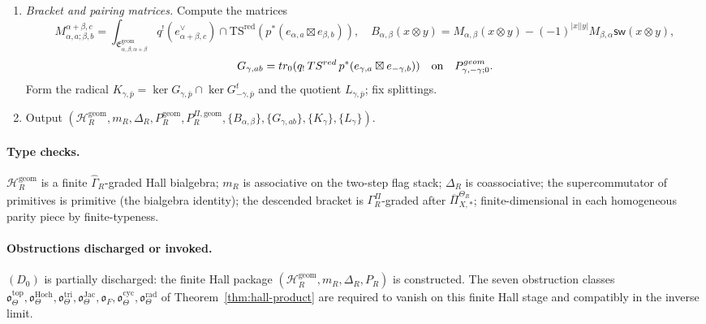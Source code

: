 \begin{enumerate}
\item \emph{Bracket and pairing matrices.}  Compute the matrices
\[
M^{\alpha+\beta,c}_{\alpha,a;\beta,b}
=\int_{\mathfrak E^{\mathrm{geom}}_{\alpha,\beta;\alpha+\beta}}
q^!(e_{\alpha+\beta,c}^\vee)\cap
\mathrm{TS}^{\mathrm{red}}(p^*(e_{\alpha,a}\boxtimes e_{\beta,b})),
\quad
B_{\alpha,\beta}(x\otimes y)
=M_{\alpha,\beta}(x\otimes y)
-(-1)^{|x||y|}M_{\beta,\alpha}\mathsf{sw}(x\otimes y),
\]
\[
G_{\gamma,ab}=
\mathrm{tr}_0(q_!\,\mathrm{TS}^{\mathrm{red}}\,p^*
(e_{\gamma,a}\boxtimes e_{-\gamma,b}))
\quad\hbox{on}\quad
\mathfrak P^{\mathrm{geom}}_{\gamma,-\gamma;0}.
\]
Form the radical
\(K_{\gamma,\bar p}
=\ker G_{\gamma,\bar p}\cap\ker G_{-\gamma,\bar p}^t\) and the
quotient \(L_{\gamma,\bar p}\); fix splittings.

\item Output
\((\mathcal H_R^{\mathrm{geom}},m_R,\Delta_R,P_R^{\mathrm{geom}},
P_R^{\Pi,\mathrm{geom}},
\{B_{\alpha,\beta}\},\{G_{\gamma,ab}\},\{K_\gamma\},\{L_\gamma\})\).
\end{enumerate}

\paragraph{Type checks.}
\(\mathcal H_R^{\mathrm{geom}}\) is a finite \(\widehat\Gamma_R\)-graded
Hall bialgebra; \(m_R\) is associative on the two-step flag stack;
\(\Delta_R\) is coassociative; the supercommutator of primitives is
primitive (the bialgebra identity); the descended bracket is
\(\Gamma_R^\Pi\)-graded after \(\overline\Pi_{X,*}^{\Theta_R}\);
finite-dimensional in each homogeneous parity piece by
finite-typeness.

\paragraph{Obstructions discharged or invoked.}
\((D_0)\) is partially discharged: the finite Hall package
\((\mathcal H_R^{\mathrm{geom}},m_R,\Delta_R,P_R)\) is constructed.
The seven obstruction classes
\(\mathfrak o_\Theta^{\mathrm{top}},
\mathfrak o_\Theta^{\mathrm{Hoch}},
\mathfrak o_\Theta^{\mathrm{tri}},
\mathfrak o_\Theta^{\mathrm{Jac}},
\mathfrak o_F,
\mathfrak o_\Theta^{\mathrm{cyc}},
\mathfrak o_\Theta^{\mathrm{rad}}\) of
Theorem~\ref{thm:hall-product} are required to vanish on
this finite Hall stage and compatibly in the inverse limit.

